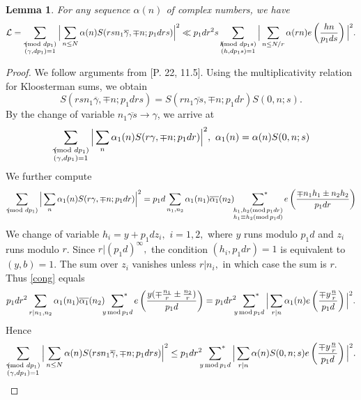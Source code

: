 \documentclass[12pt,a4paper,twoside, reqno]{amsart}
\newcommand{\shortmod}{\ensuremath{\negthickspace \negthickspace \negthickspace \pmod}}
\newcommand{\sumstar}{\sideset{}{^*}\sum}
\newtheorem{lemma}{Lemma}
\begin{document}
\begin{lemma}\label{kloosterman simple}
   For any sequence $\alpha(n)$ of complex numbers, we have 
   \[   \mathcal{L}= \sum_{\substack{ \gamma \shortmod{dp_1} \\ (\gamma, dp_1)=1 }   } \Big|   \sum_{n \leq N} \alpha(n) S(rsn_1 \overline{\gamma}, \mp n;p_1drs)    \Big|^2 \ll  p_1dr^2s \sum_{\substack{ h \shortmod{dp_1 s} \\ (h, dp_1s)=1 }   } \Big|   \sum_{n \leq N/r } \alpha(rn) e\left( \frac{hn}{p_1ds}\right)     \Big|^2. \]
\end{lemma}
\begin{proof}
We follow arguments from \cite{MY11}[P. 22, 11.5]. 
    Using  the multiplicativity relation for Kloosterman sums, we obtain
    \[S(rsn_1 \overline{\gamma}, \mp n;p_1drs)= S(rn_1 \overline{\gamma s}, \mp n;p_1dr) S(0,  n;s). \]
    By the change of variable $n_1 \overline{\gamma s} \rightarrow \gamma$, we  arrive at 
    \begin{align*}
     \sum_{\substack{ \gamma \shortmod{dp_1} \\ (\gamma, dp_1)=1 }   } \Big|   \sum_{n} \alpha_1(n) S(r {\gamma}, \mp n;p_1dr)    \Big|^2, \ \alpha_1(n)=\alpha(n) S(0,n;s)
\end{align*}
We further compute 
\begin{align}\label{cong}
     \sum_{\substack{ \gamma \shortmod{dp_1}  }   } \Big|   \sum_{n} \alpha_1(n) S(r {\gamma}, \mp n;p_1dr)    \Big|^2=p_1d \sum_{n_1,n_2} \alpha_1(n_1) \overline{\alpha_1}(n_2) \mathop{\sumstar_{ \substack{h_1, h_2(\mathrm{mod}\, p_1dr)  \\ h_1 \equiv h_2 (\mathrm{mod}\, p_1d)
       } } } e\left( \frac{\mp n_1 h_1 \pm n_2h_2 }{p_1dr}\right)
\end{align}
We  change of variable $h_i=y+p_1d z_i, $ $i=1,2,$ where $y$ runs modulo $p_1d$ and $z_i$ runs modulo $r$. Since $r |(p_1d)^\infty,$ the condition $(h_i,p_1dr)=1$ is equivalent to $(y,b)=1$. The sum over $z_i$ vanishes unless $r|n_i,$ in which case the sum is $r$. Thus \eqref{cong} equals
\[p_1dr^2\sum_{r |n_1,n_2} \alpha_1(n_1) \overline{\alpha_1}(n_2) \sumstar_{y\, \mathrm{mod}\, p_1d} e \left( \frac{y (\mp\frac{n_1}{r} \pm\frac{n_2}{r})}{p_1d}\right)= p_1dr^2 \sumstar_{y\, \mathrm{mod}\, p_1d} \Big| \sum_{r|n} \alpha_1(n) e \left( \frac{\mp y\frac{n}{r}}{p_1d} \right)\Big|^2 .  \]
Hence 
\[  \sum_{\substack{ \gamma \shortmod{dp_1} \\ (\gamma, dp_1)=1 }   } \Big|   \sum_{n \leq N} \alpha(n) S(rsn_1 \overline{\gamma}, \mp n;p_1drs)    \Big|^2 \leq p_1dr^2 \sumstar_{y\, \mathrm{mod}\, p_1d} \Big| \sum_{r|n} \alpha(n) S(0,n;s) e \left( \frac{\mp y\frac{n}{r}}{p_1d} \right)\Big|^2. \]

\end{proof}
\end{document}
